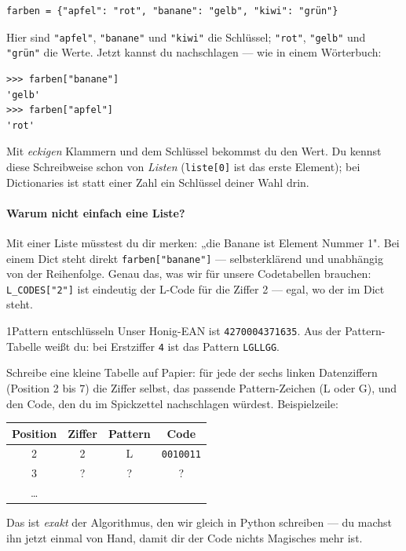 \begin{verbatim}
farben = {"apfel": "rot", "banane": "gelb", "kiwi": "grün"}
\end{verbatim}

Hier sind \texttt{"apfel"}, \texttt{"banane"} und \texttt{"kiwi"} die
Schlüssel; \texttt{"rot"}, \texttt{"gelb"} und \texttt{"grün"} die
Werte. Jetzt kannst du nachschlagen — wie in einem Wörterbuch:

\begin{verbatim}
>>> farben["banane"]
'gelb'
>>> farben["apfel"]
'rot'
\end{verbatim}

Mit \emph{eckigen} Klammern und dem Schlüssel bekommst du den Wert.
Du kennst diese Schreibweise schon von \emph{Listen} (\texttt{liste[0]}
ist das erste Element); bei Dictionaries ist statt einer Zahl ein
Schlüssel deiner Wahl drin.

\paragraph{Warum nicht einfach eine Liste?}
Mit einer Liste müsstest du dir merken: „die Banane ist Element Nummer 1".
Bei einem Dict steht direkt \texttt{farben["banane"]} — selbsterklärend
und unabhängig von der Reihenfolge. Genau das, was wir für unsere
Codetabellen brauchen: \texttt{L\_CODES["2"]} ist eindeutig der L-Code
für die Ziffer 2 — egal, wo der im Dict steht.

\begin{bleistiftuebung}{1}{Pattern entschlüsseln}
Unser Honig-EAN ist \texttt{4270004371635}. Aus der Pattern-Tabelle
weißt du: bei Erstziffer \texttt{4} ist das Pattern \texttt{LGLLGG}.

Schreibe eine kleine Tabelle auf Papier: für jede der sechs linken
Datenziffern (Position 2 bis 7) die Ziffer selbst, das passende
Pattern-Zeichen (L oder G), und den Code, den du im Spickzettel
nachschlagen würdest. Beispielzeile:

\begin{center}
\small
\begin{tabular}{c c c c}
\toprule
Position & Ziffer & Pattern & Code \\
\midrule
2 & 2 & L & \texttt{0010011} \\
3 & ? & ? & ? \\
\dots \\
\bottomrule
\end{tabular}
\end{center}

Das ist \emph{exakt} der Algorithmus, den wir gleich in Python
schreiben — du machst ihn jetzt einmal von Hand, damit dir der
Code nichts Magisches mehr ist.
\end{bleistiftuebung}

